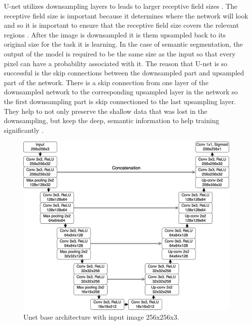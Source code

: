 U-net utilizes downsampling layers to leads to larger receptive field sizes \cite{DBLP:journals/corr/LongSD14}. 
The receptive field size is important because it determines where the network will look and so it is important to ensure that the receptive field size covers the relevant regions \cite{NIPS2016_6203}.
After the image is downsampled it is them upsampled back to its original size for the task it is learning.
In the case of semantic segmentation, the output of the model is required to be the same size as the input so that every pixel can have a probability associated with it.
The reason that U-net is so successful is the skip connections between the downsampled part and upsampled part of the network.
There is a skip connection from one layer of the downsampled network to the corresponding upsampled layer in the network so the first downsampling part is skip connectioned to the last upsampling layer. 
They help to not only preserve the shallow data that was lost in the downsampling, but keep the deep, semantic information to help training significantly \cite{DBLP:journals/corr/LongSD14}.



\begin{figure}[tbh]
\centering
\includegraphics[width=\textwidth]{Unet_Architecture.png}
\caption{Unet base architecture with input image 256x256x3.}
\label{fig_Unet}
\end{figure}

